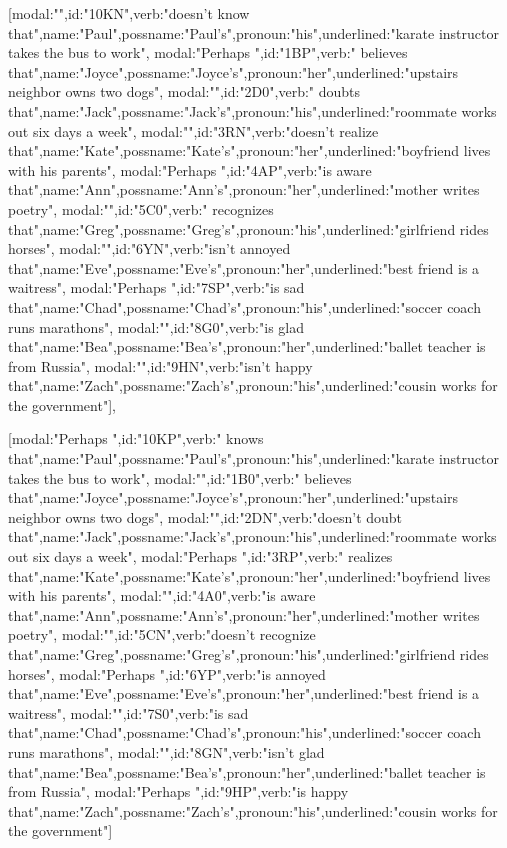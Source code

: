 [{modal:"",id:"10KN",verb:"doesn't know that",name:"Paul",possname:"Paul's",pronoun:"his",underlined:"karate instructor takes the bus to work"},
{modal:"Perhaps ",id:"1BP",verb:" believes that",name:"Joyce",possname:"Joyce's",pronoun:"her",underlined:"upstairs neighbor owns two dogs"},
{modal:"",id:"2D0",verb:" doubts that",name:"Jack",possname:"Jack's",pronoun:"his",underlined:"roommate works out six days a week"},
{modal:"",id:"3RN",verb:"doesn't realize that",name:"Kate",possname:"Kate's",pronoun:"her",underlined:"boyfriend lives with his parents"},
{modal:"Perhaps ",id:"4AP",verb:"is aware that",name:"Ann",possname:"Ann's",pronoun:"her",underlined:"mother writes poetry"},
{modal:"",id:"5C0",verb:" recognizes that",name:"Greg",possname:"Greg's",pronoun:"his",underlined:"girlfriend rides horses"},
{modal:"",id:"6YN",verb:"isn't annoyed that",name:"Eve",possname:"Eve's",pronoun:"her",underlined:"best friend is a waitress"},
{modal:"Perhaps ",id:"7SP",verb:"is sad that",name:"Chad",possname:"Chad's",pronoun:"his",underlined:"soccer coach runs marathons"},
{modal:"",id:"8G0",verb:"is glad that",name:"Bea",possname:"Bea's",pronoun:"her",underlined:"ballet teacher is from Russia"},
{modal:"",id:"9HN",verb:"isn't happy that",name:"Zach",possname:"Zach's",pronoun:"his",underlined:"cousin works for the government"}],

[{modal:"Perhaps ",id:"10KP",verb:" knows that",name:"Paul",possname:"Paul's",pronoun:"his",underlined:"karate instructor takes the bus to work"},
{modal:"",id:"1B0",verb:" believes that",name:"Joyce",possname:"Joyce's",pronoun:"her",underlined:"upstairs neighbor owns two dogs"},
{modal:"",id:"2DN",verb:"doesn't doubt that",name:"Jack",possname:"Jack's",pronoun:"his",underlined:"roommate works out six days a week"},
{modal:"Perhaps ",id:"3RP",verb:" realizes that",name:"Kate",possname:"Kate's",pronoun:"her",underlined:"boyfriend lives with his parents"},
{modal:"",id:"4A0",verb:"is aware that",name:"Ann",possname:"Ann's",pronoun:"her",underlined:"mother writes poetry"},
{modal:"",id:"5CN",verb:"doesn't recognize that",name:"Greg",possname:"Greg's",pronoun:"his",underlined:"girlfriend rides horses"},
{modal:"Perhaps ",id:"6YP",verb:"is annoyed that",name:"Eve",possname:"Eve's",pronoun:"her",underlined:"best friend is a waitress"},
{modal:"",id:"7S0",verb:"is sad that",name:"Chad",possname:"Chad's",pronoun:"his",underlined:"soccer coach runs marathons"},
{modal:"",id:"8GN",verb:"isn't glad that",name:"Bea",possname:"Bea's",pronoun:"her",underlined:"ballet teacher is from Russia"},
{modal:"Perhaps ",id:"9HP",verb:"is happy that",name:"Zach",possname:"Zach's",pronoun:"his",underlined:"cousin works for the government"}]
